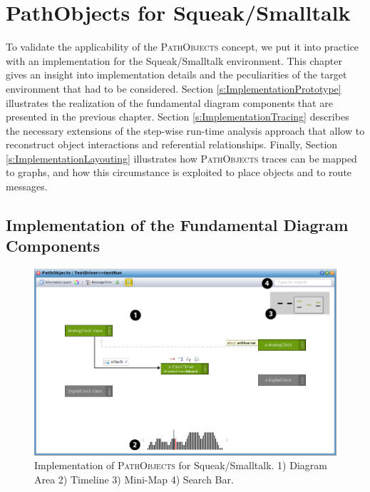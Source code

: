 \chapter{PathObjects for Squeak/Smalltalk}
\label{c:implementation}
To validate the applicability of the \textsc{PathObjects} concept, we put it into practice with an implementation for the Squeak/Smalltalk environment.
This chapter gives an insight into implementation details and the peculiarities of the target environment that had to be considered.
Section \ref{s:ImplementationPrototype} illustrates the realization of the fundamental diagram components that are presented in the previous chapter.
Section \ref{s:ImplementationTracing} describes the necessary extensions of the step-wise run-time analysis approach that allow to reconstruct object interactions and referential relationships.
Finally, Section \ref{s:ImplementationLayouting} illustrates how \textsc{PathObjects} traces can be mapped to graphs, and how this circumstance is exploited to place objects and to route messages.

\section[Implementation of the Fundamental Diagram Components]{Implementation of the Fundamental Diagram Components%
}
\label{s:ImplementationPrototype}

\begin{figure}[tb]
	\centering
	\includegraphics[width=1\textwidth]{../images/04-ImplMainWindow}
	\caption[\textsc{PathObjects} for Squeak/Smalltalk]{Implementation of \textsc{PathObjects} for Squeak/Smalltalk. 1) Diagram Area 2) Timeline 3) Mini-Map 4) Search Bar.}
	\label{fig:ImplementationMainWindow}
\end{figure}

